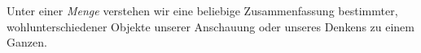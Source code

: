 \documentclass[../../main.tex]{subfiles}
\begin{document}
	\begin{definition}[Menge]
		\label{def:Menge}
		Unter einer \textit{Menge} verstehen wir eine beliebige Zusammenfassung bestimmter, wohlunterschiedener Objekte unserer Anschauung oder unseres Denkens zu einem Ganzen.
	\end{definition}
\end{document}
